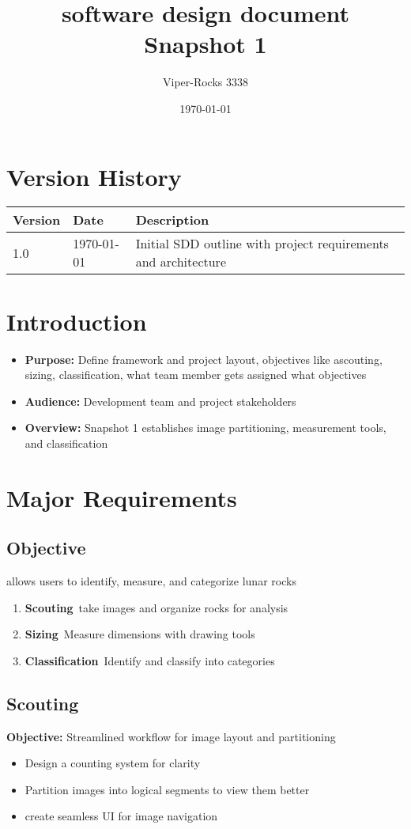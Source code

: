 \documentclass{article}
\title{software design document \\ Snapshot 1}
\author{Viper-Rocks 3338}
\date{\today}
\begin{document}
\maketitle

\tableofcontents

\section*{Version History}
\begin{tabular}{|l|l|l|}
\hline
Version & Date & Description \\
\hline
1.0 & \today & Initial SDD outline with project requirements and architecture \\
\hline
\end{tabular}

\section{Introduction}
\begin{itemize}
  \item \textbf{Purpose:} Define  framework and project layout, objectives like ascouting, sizing, classification, what team member gets assigned what objectives
  \item \textbf{Audience:} Development team and project stakeholders
  \item \textbf{Overview:} Snapshot 1 establishes  image partitioning, measurement tools, and classification 
\end{itemize}

\section{Major Requirements}
\subsection{Objective }
allows users to identify, measure, and categorize lunar rocks
\begin{enumerate}
  \item \textbf{Scouting}\
    take images and organize rocks for analysis
  \item \textbf{Sizing}\
    Measure dimensions with drawing tools
  \item \textbf{Classification}\
    Identify and classify into  categories
\end{enumerate}

\subsection{Scouting}
\textbf{Objective:} Streamlined workflow for image layout and partitioning
\begin{itemize}
  \item Design a counting system for clarity
  \item Partition images into logical segments to view them better
  \item create seamless UI for image navigation
\end{itemize}
\end{document}
